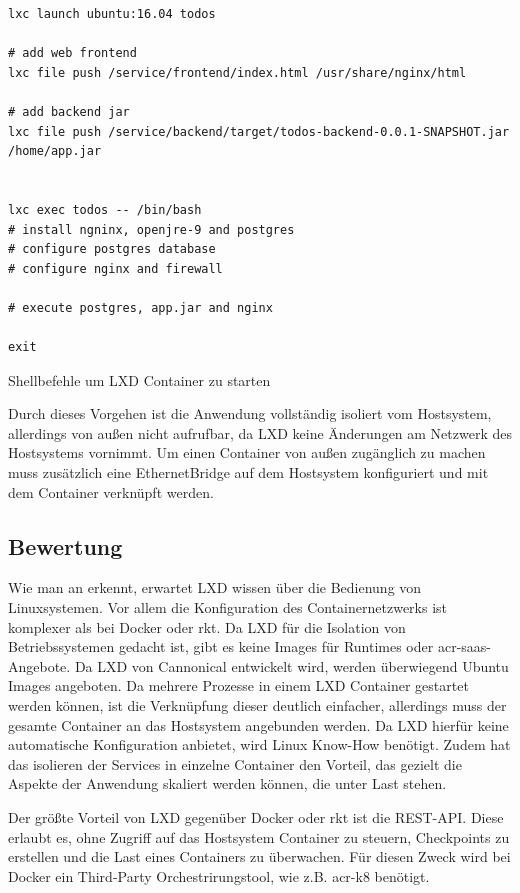 \begin{listing}[h]
	\begin{verbatim}
lxc launch ubuntu:16.04 todos

# add web frontend
lxc file push /service/frontend/index.html /usr/share/nginx/html

# add backend jar
lxc file push /service/backend/target/todos-backend-0.0.1-SNAPSHOT.jar /home/app.jar


lxc exec todos -- /bin/bash
# install ngninx, openjre-9 and postgres
# configure postgres database
# configure nginx and firewall

# execute postgres, app.jar and nginx

exit
	\end{verbatim}
	\caption{Shellbefehle um LXD Container zu starten}
	\label{lst:lxdConfig}
\end{listing}

Durch dieses Vorgehen ist die Anwendung vollständig isoliert vom Hostsystem, allerdings von außen nicht aufrufbar, da LXD keine Änderungen am Netzwerk des Hostsystems vornimmt. Um einen Container von außen zugänglich zu machen muss zusätzlich eine EthernetBridge auf dem Hostsystem konfiguriert und mit dem Container verknüpft werden.

\subsection{Bewertung}
\label{sec:compLXDBewertung}
Wie man an  erkennt, erwartet LXD wissen über die Bedienung von Linuxsystemen. Vor allem die Konfiguration des Containernetzwerks ist komplexer als bei Docker oder rkt. Da LXD für die Isolation von Betriebssystemen gedacht ist, gibt es keine Images für Runtimes oder \gls{acr-saas}-Angebote. Da LXD von Cannonical entwickelt wird, werden überwiegend Ubuntu Images angeboten. Da mehrere Prozesse in einem LXD Container gestartet werden können, ist die Verknüpfung dieser deutlich einfacher, allerdings muss der gesamte Container an das Hostsystem angebunden werden. Da LXD hierfür keine automatische Konfiguration anbietet, wird Linux Know-How benötigt. Zudem hat das isolieren der Services in einzelne Container den Vorteil, das gezielt die Aspekte der Anwendung skaliert werden können, die unter Last stehen.

Der größte Vorteil von LXD gegenüber Docker oder rkt ist die REST-API. Diese erlaubt es, ohne Zugriff auf das Hostsystem Container zu steuern, Checkpoints zu erstellen und die Last eines Containers zu überwachen. Für diesen Zweck wird bei Docker ein Third-Party Orchestrirungstool, wie z.B. \gls{acr-k8} benötigt.

